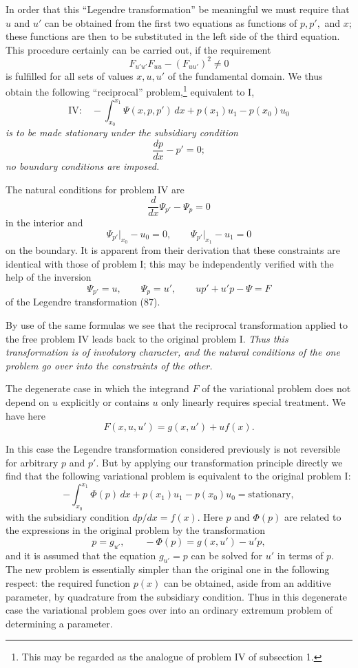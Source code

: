 In order that this ``Legendre transformation'' be meaningful we must require that $u$ and $u'$ can be obtained from the first two equations as functions of $p,p',$ and $x$; these functions are then to be substituted in the left side of the third equation. This procedure certainly can be carried out, if the requirement
\begin{equation}\tag{88}
F_{u'u'}F_{uu}-(F_{uu'})^2\ne0
\end{equation}
is fulfilled for all sets of values $x,u,u'$ of the fundamental domain. We thus obtain the following ``reciprocal'' problem,\footnote{This may be regarded as the analogue of problem IV of subsection 1.} equivalent to I,
\[
\text{IV:}\quad -\int_{x_0}^{x_1}\Psi(x,p,p')\,dx+p(x_1)u_1-p(x_0)u_0
\]
\emph{is to be made stationary under the subsidiary condition}
\[
\frac{dp}{dx}-p'=0;
\]
\emph{no boundary conditions are imposed.}

The natural conditions for problem IV are
\[
\frac{d}{dx}\Psi_{p'}-\Psi_p=0
\]
in the interior and
\[
\Psi_{p'}\big|_{x_0}-u_0=0,\qquad \Psi_{p'}\big|_{x_1}-u_1=0
\]
on the boundary. It is apparent from their derivation that these constraints are identical with those of problem I; this may be independently verified with the help of the inversion
\[
\Psi_{p'}=u,\qquad \Psi_p=u',\qquad up'+u'p-\Psi=F
\]
of the Legendre transformation (87).

By use of the same formulas we see that the reciprocal transformation applied to the free problem IV leads back to the original problem I. \emph{Thus this transformation is of involutory character, and the natural conditions of the one problem go over into the constraints of the other.}

The degenerate case in which the integrand $F$ of the variational problem does not depend on $u$ explicitly or contains $u$ only linearly requires special treatment. We have here
\[
F(x,u,u')=g(x,u')+u f(x).
\]

In this case the Legendre transformation considered previously is not reversible for arbitrary $p$ and $p'$. But by applying our transformation principle directly we find that the following variational problem is equivalent to the original problem I:
\[
-\int_{x_0}^{x_1}\Phi(p)\,dx+p(x_1)u_1-p(x_0)u_0=\text{stationary},
\]
with the subsidiary condition $dp/dx=f(x)$. Here $p$ and $\Phi(p)$ are related to the expressions in the original problem by the transformation
\[
p=g_{u'},\qquad -\Phi(p)=g(x,u')-u'p,
\]
and it is assumed that the equation $g_{u'}=p$ can be solved for $u'$ in terms of $p$. The new problem is essentially simpler than the original one in the following respect: the required function $p(x)$ can be obtained, aside from an additive parameter, by quadrature from the subsidiary condition. Thus in this degenerate case the variational problem goes over into an ordinary extremum problem of determining a parameter.

